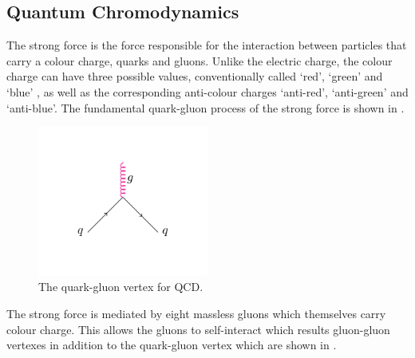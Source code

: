 \subsection{Quantum Chromodynamics}
\label{sec:QCD}
The strong force is the force responsible for the interaction between particles
that carry a colour charge, quarks and gluons. Unlike the electric charge, the
colour charge can have three possible values, conventionally called `red',
`green' and `blue' , as well as the corresponding anti-colour charges
`anti-red', `anti-green' and `anti-blue'.
The fundamental quark-gluon process of the strong force is shown in
.
\begin{figure}[htbp]
  \centering
  \includegraphics[width=0.5\textwidth]{qcd_process}
  \caption{The quark-gluon vertex for {QCD}.}
  \label{fig:qcdquark}
\end{figure}
The strong force is mediated by eight massless gluons which themselves carry
colour charge. This allows the gluons to self-interact which results gluon-gluon
vertexes in addition to the quark-gluon vertex which are shown in
.

